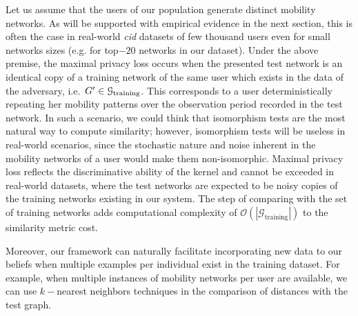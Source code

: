 Let us assume that the users of our population generate distinct mobility networks.
As will be supported with empirical evidence in the next section, this is often the case in real-world \emph{cid} datasets of few thousand users even for small networks sizes (e.g. for top$-20$ networks in our dataset).
Under the above premise, the maximal privacy loss occurs when the presented test network is an identical copy of a training network of the same user which exists in the data of the adversary, i.e.\ $ G' \in \mathcal{G}_\text{training}$.
This corresponds to a user deterministically repeating her mobility patterns over the observation period recorded in the test network.
In such a scenario, we could think that isomorphism tests are the most natural way to compute similarity; however, isomorphism tests will be useless in real-world scenarios, since the stochastic nature and noise inherent in the mobility networks of a user would make them non-isomorphic.
Maximal privacy loss reflects the discriminative ability of the kernel and cannot be exceeded in real-world datasets, where the test networks are expected to be noisy copies of the training networks existing in our system.
The step of comparing with the set of training networks adds computational complexity of $\mathcal{O}(|\mathcal{G}_{\text{training}}|)$ to the similarity metric cost.

Moreover, our framework can naturally facilitate incorporating new data to our beliefs when multiple examples per individual exist in the training dataset.
For example, when multiple instances of mobility networks per user are available, we can use $k-$nearest neighbors techniques in the comparison of distances with the test graph.
